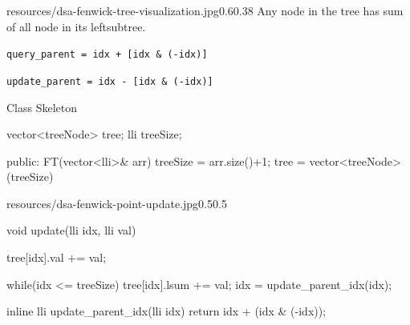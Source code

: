 \begin{lfigure}{resources/dsa-fenwick-tree-visualization.jpg}{0.6}{0.38}
    Any node in the tree has sum of all node in its leftsubtree.
    \vspace{1cm}

    \verb|query_parent = idx + [idx & (-idx)]|

    \verb|update_parent = idx - [idx & (-idx)]|

    \vspace{2cm}
    Class Skeleton
    \begin{code3}

    vector<treeNode> tree;
    lli treeSize;

    public:
    FT(vector<lli>& arr)
    {
        treeSize = arr.size()+1;
        tree = 
        vector<treeNode>(treeSize)
    }
    \end{code3}

\end{lfigure}

\begin{lfigure}{resources/dsa-fenwick-point-update.jpg}{0.5}{0.5}

    \begin{code3}
    void update(lli idx, lli val)
    {
        tree[idx].val += val;

        while(idx <= treeSize)
        {
            tree[idx].lsum += val;
            idx = update_parent_idx(idx);
        }
    }

  
    inline lli update_parent_idx(lli idx)
    {
        return  idx + (idx & (-idx));
    }
    \end{code3}

\end{lfigure}

